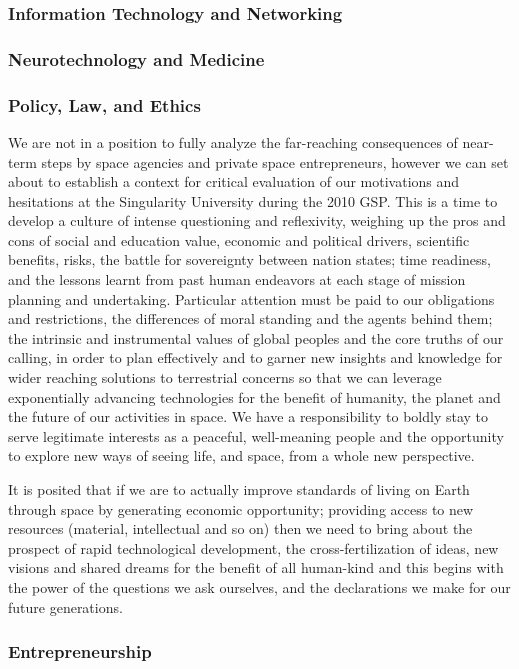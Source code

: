 \subsubsection{Information Technology and Networking}



\subsubsection{Neurotechnology and Medicine}



\subsubsection{Policy, Law, and Ethics}

We are not in a position to fully analyze the far-reaching consequences of near-term steps by space agencies and private space entrepreneurs, however we can set about to establish a  context for critical evaluation of our motivations and hesitations at the Singularity University during the 2010 GSP. This is a time to develop a culture of intense questioning and reflexivity, weighing up the pros and cons of social and education value, economic and political drivers, scientific benefits, risks, the battle for sovereignty between nation states; time readiness, and the lessons learnt from past human endeavors at each stage of mission  planning and undertaking. Particular attention must be paid to our obligations and restrictions, the differences of moral standing and the agents behind them; the intrinsic and instrumental values of global peoples and the core truths of our calling, in order to plan effectively and to garner new insights and knowledge for wider reaching solutions to terrestrial concerns so that we can leverage exponentially advancing technologies for the benefit of humanity, the planet and the future of our activities in space. We have a responsibility to boldly stay to serve legitimate interests as a peaceful, well-meaning people and the opportunity to explore new ways of seeing life, and space, from a whole new perspective. 

It is posited that if we are to actually improve standards of living on Earth through space by  generating economic opportunity; providing access to new resources (material, intellectual and so on) then we need to bring about the prospect of rapid technological development, the cross-fertilization of ideas, new visions and shared dreams for the benefit of all human-kind and this begins with the power of the questions we ask ourselves, and the declarations we make for our future generations. 

\subsubsection{Entrepreneurship}

